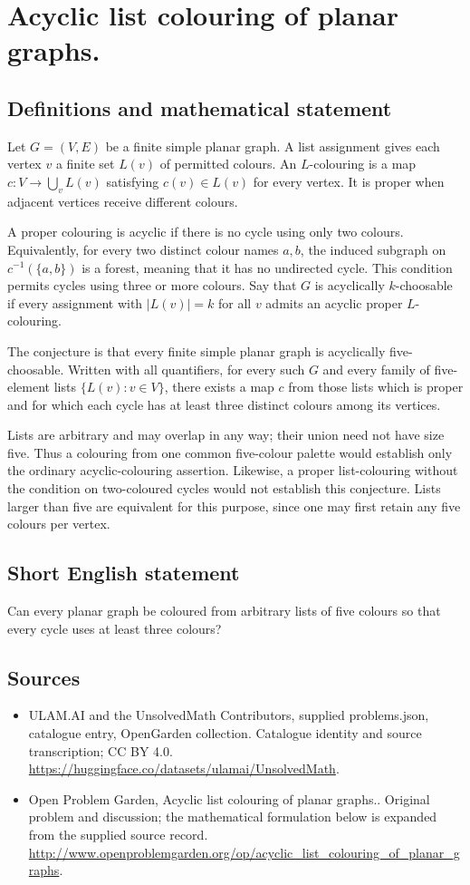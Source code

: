\documentclass[11pt,a4paper]{article}
\begin{document}
\section*{Acyclic list colouring of planar graphs.}\label{statement}

\subsection{Definitions and mathematical statement}
Let $G=(V,E)$ be a finite simple planar graph. A list assignment gives each
vertex $v$ a finite set $L(v)$ of permitted colours. An $L$-colouring is a
map $c:V\to\bigcup_vL(v)$ satisfying $c(v)\in L(v)$ for every vertex.
It is proper when adjacent vertices receive different colours.

A proper colouring is acyclic if there is no cycle using only two colours.
Equivalently, for every two distinct colour names $a,b$, the induced
subgraph on $c^{-1}(\{a,b\})$ is a forest, meaning that it has no
undirected cycle. This condition permits cycles using three or more
colours. Say that $G$ is acyclically $k$-choosable if every assignment with
$|L(v)|=k$ for all $v$ admits an acyclic proper $L$-colouring.

The conjecture is that every finite simple planar graph is acyclically
five-choosable. Written with all quantifiers, for every such $G$ and every
family of five-element lists $\{L(v):v\in V\}$, there exists a map $c$
from those lists which is proper and for which each cycle has at least
three distinct colours among its vertices.

Lists are arbitrary and may overlap in any way; their union need not
have size five. Thus a colouring from one common five-colour palette
would establish only the ordinary acyclic-colouring assertion. Likewise,
a proper list-colouring without the condition on two-coloured cycles
would not establish this conjecture. Lists larger than five are equivalent
for this purpose, since one may first retain any five colours per vertex.
\subsection{Short English statement}
Can every planar graph be coloured from arbitrary lists of five colours so that every cycle uses at least three colours?
\subsection{Sources}
\begin{itemize}
\item[S1] ULAM.AI and the UnsolvedMath Contributors, supplied problems.json, catalogue entry, OpenGarden collection. Catalogue identity and source transcription; CC BY 4.0.
\url{https://huggingface.co/datasets/ulamai/UnsolvedMath}.
\item[S2] Open Problem Garden, Acyclic list colouring of planar graphs.. Original problem and discussion; the mathematical formulation below is expanded from the supplied source record.
\url{http://www.openproblemgarden.org/op/acyclic_list_colouring_of_planar_graphs}.
\end{itemize}
\end{document}
